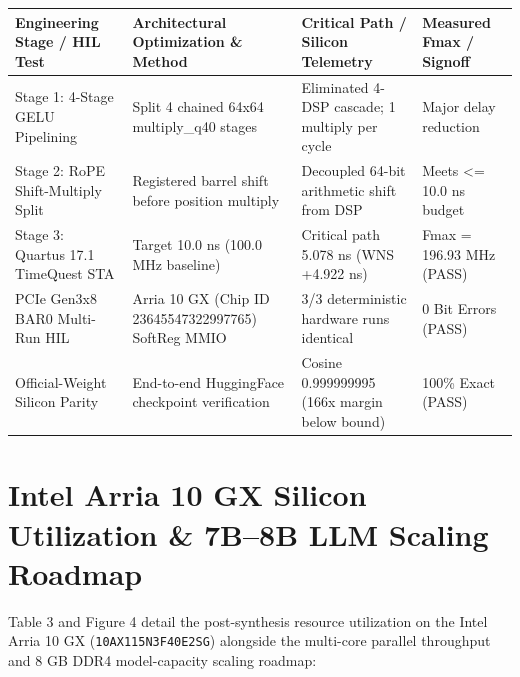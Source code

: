 \documentclass[11pt,a4paper]{article}
\begin{document}
{\footnotesize\renewcommand{\arraystretch}{1.14}\begin{longtable}{@{}L{0.23\textwidth}L{0.27\textwidth}L{0.24\textwidth}L{0.16\textwidth}@{}}\toprule

\textbf{Engineering Stage /\allowbreak{} HIL Test} & \textbf{Architectural Optimization \& Method} & \textbf{Critical Path /\allowbreak{} Silicon Telemetry} & \textbf{Measured Fmax /\allowbreak{} Signoff}\\\midrule\endhead

Stage 1: 4-Stage GELU Pipelining & Split 4 chained 64x64 multiply\_\allowbreak{}q40 stages & Eliminated 4-DSP cascade; 1 multiply per cycle & Major delay reduction\\[2pt]

Stage 2: RoPE Shift-Multiply Split & Registered barrel shift before position multiply & Decoupled 64-bit arithmetic shift from DSP & Meets <=\allowbreak{} 10.0 ns budget\\[2pt]

Stage 3: Quartus 17.1 TimeQuest STA & Target 10.0 ns (\allowbreak{}100.0 MHz baseline)\allowbreak{} & Critical path 5.078 ns (\allowbreak{}WNS +\allowbreak{}4.922 ns)\allowbreak{} & Fmax =\allowbreak{} 196.93 MHz (\allowbreak{}PASS)\allowbreak{}\\[2pt]

PCIe Gen3x8 BAR0 Multi-Run HIL & Arria 10 GX (\allowbreak{}Chip ID 23645547\allowbreak{}32299776\allowbreak{}5)\allowbreak{} SoftReg MMIO & 3/\allowbreak{}3 deterministic hardware runs identical & 0 Bit Errors (\allowbreak{}PASS)\allowbreak{}\\[2pt]

Official-Weight Silicon Parity & End-to-end HuggingFace checkpoint verification & Cosine 0.99999999\allowbreak{}5 (\allowbreak{}166x margin below bound)\allowbreak{} & 100\% Exact (\allowbreak{}PASS)\allowbreak{}\\[2pt]

\bottomrule\end{longtable}}

\section{Intel Arria 10 GX Silicon Utilization \& 7B--8B LLM Scaling Roadmap}

Table 3 and Figure 4 detail the post-synthesis resource utilization on the Intel Arria 10 GX (\texttt{10AX115N3F40E2SG}) alongside the multi-core parallel throughput and 8 GB DDR4 model-capacity scaling roadmap:
\end{document}
